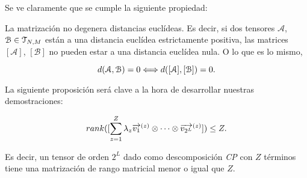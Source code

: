 Se ve claramente que se cumple la siguiente propiedad:

\begin{proposicion} \label{prop:matrizacion_no_degenera_distancias}
    La matrización no degenera distancias euclídeas. Es decir, si dos tensores $\mathcal{A}$, $\mathcal{B} \in \mathcal{T}_{N, M}$ están a una distancia euclídea estrictamente positiva, las matrices $[\mathcal{A}]$, $[\mathcal{B}]$ no pueden estar a una distancia euclídea nula. O lo que es lo mismo,

    \begin{equation}
        d(\mathcal{A}, \mathcal{B}) = 0 \Longleftrightarrow d([\mathcal{A}], [\mathcal{B}]) = 0.
    \end{equation}
\end{proposicion}

La siguiente proposición será clave a la hora de desarrollar nuestras demostraciones:

\begin{proposicion} \label{prop:rango_matricial_descomp_cp}

    \begin{equation}
        rank([\sum_{z = 1}^Z \lambda_z \overrightarrow{v_1}^{(z)} \otimes \cdots \otimes \overrightarrow{v_{2^L}}^{(z)}]) \leq Z.
    \end{equation}

    Es decir, un tensor de orden $2^L$ dado como descomposición \textit{CP} con $Z$ términos tiene una matrización de rango matricial menor o igual que $Z$.

\end{proposicion}

